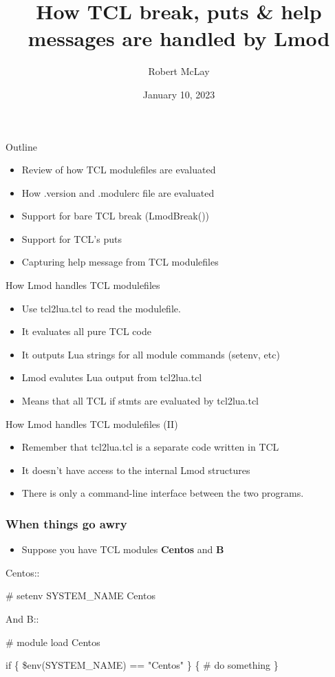 \documentclass{beamer}
\begin{document}
\title[Lmod]{How TCL break, puts \& help messages are handled by Lmod}
\author{Robert McLay} 
\date{January 10, 2023}

\frame{\titlepage} 


\begin{frame}{Outline}
  \begin{itemize}
    \item Review of how TCL modulefiles are evaluated
    \item How .version and .modulerc file are evaluated
    \item Support for bare TCL break (LmodBreak())
    \item Support for TCL's puts
    \item Capturing help message from TCL modulefiles 
  \end{itemize}
\end{frame}

\begin{frame}{How Lmod handles TCL modulefiles}
  \begin{itemize}
    \item Use tcl2lua.tcl to read the modulefile.
    \item It evaluates all pure TCL code
    \item It outputs Lua strings for all module commands (setenv, etc)
    \item Lmod evalutes Lua output from tcl2lua.tcl
    \item Means that all TCL if stmts are evaluated by tcl2lua.tcl
  \end{itemize}
\end{frame}

\begin{frame}{How Lmod handles TCL modulefiles (II)}
  \begin{itemize}
    \item Remember that tcl2lua.tcl is a separate code written in TCL
    \item It doesn't have access to the internal Lmod structures
    \item There is only a command-line interface between the two programs.
  \end{itemize}
\end{frame}

\begin{frame}[fragile]
    \frametitle{When things go awry}
  \begin{itemize}
    \item Suppose you have TCL modules \textbf{Centos} and \textbf{B}
  \end{itemize}
 {\tiny
    \begin{semiverbatim}
Centos::

    #%
    setenv SYSTEM\_NAME Centos

And B::

    #%
    module load Centos

    if \{ \$env(SYSTEM\_NAME) == "Centos" \} \{
       # do something
    \}

    \end{semiverbatim}
}
\end{frame}
\end{document}
